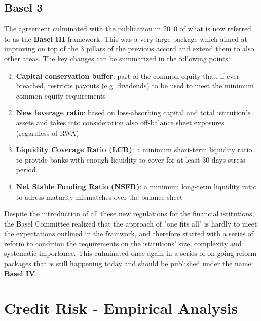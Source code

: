 \documentclass[a4paper,12pt]{article}
\begin{document}
    \subsection[]{Basel 3}
    The agreement culminated with the publication in 2010 of what is now referred to as the \textbf{Basel III} framework. This was a very large package which aimed at improving
    on top of the 3 pillars of the previous accord and extend them to also other areas. The key changes can be summarized in the following points:
    
        \begin{enumerate}
            \item \textbf{Capital conservation buffer}: part of the common equity that, if ever breached, restricts payouts (e.g. dividends) to be used to meet the minimum common equity requirements
            \item \textbf{New leverage ratio}: based on loss-absorbing capital and total istitution's assets and takes into consideration also off-balance sheet exposures (regardless of RWA)
            \item \textbf{Liquidity Coverage Ratio (LCR)}: a minimum short-term liquidity ratio to provide banks with enough liquidity to cover for at least 30-days stress period.
            \item \textbf{Net Stable Funding Ratio (NSFR)}: a minimum long-term liquidity ratio to adress maturity mismatches over the balance sheet
        \end{enumerate}

    Despite the introduction of all these new regulations for the financial istitutions, the Basel Committee realized that the approach of "one fits all" is hardly to meet 
    the expectations outlined in the framwork, and therefore started with a series of reform to condition the requirements on the istitutions' size, complexity and systematic importance.
    This culminated once again in a series of on-going reform packages that is still happening today and should be published under the name: \textbf{Basel IV}.
    \newline

    
    \pagebreak
    \section{Credit Risk - Empirical Analysis}
\end{document}
